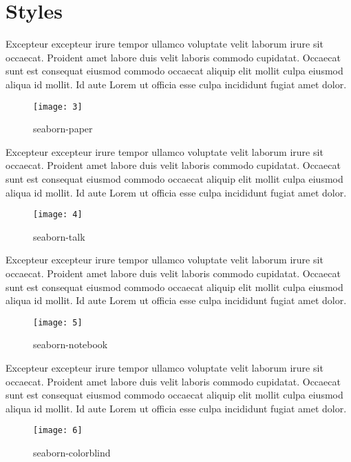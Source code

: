 \section{Styles}
\label{sec:styles}
Excepteur excepteur irure tempor ullamco voluptate velit laborum irure sit occaecat. Proident amet labore duis velit laboris commodo cupidatat. Occaecat sunt est consequat eiusmod commodo occaecat aliquip elit mollit culpa eiusmod aliqua id mollit. Id aute Lorem ut officia esse culpa incididunt fugiat amet dolor.

\begin{figure}[!h]
    \centering
    \texttt{[image: 3]}
    \caption{seaborn-paper}
    \label{fig:seaborn-paper}
\end{figure}

Excepteur excepteur irure tempor ullamco voluptate velit laborum irure sit occaecat. Proident amet labore duis velit laboris commodo cupidatat. Occaecat sunt est consequat eiusmod commodo occaecat aliquip elit mollit culpa eiusmod aliqua id mollit. Id aute Lorem ut officia esse culpa incididunt fugiat amet dolor.

\begin{figure}[!h]
    \centering
    \texttt{[image: 4]}
    \caption{seaborn-talk}
    \label{fig:seaborn-talk}
\end{figure}

Excepteur excepteur irure tempor ullamco voluptate velit laborum irure sit occaecat. Proident amet labore duis velit laboris commodo cupidatat. Occaecat sunt est consequat eiusmod commodo occaecat aliquip elit mollit culpa eiusmod aliqua id mollit. Id aute Lorem ut officia esse culpa incididunt fugiat amet dolor.

\begin{figure}[!h]
    \centering
    \texttt{[image: 5]}
    \caption{seaborn-notebook}
    \label{fig:seaborn-notebook}
\end{figure}

Excepteur excepteur irure tempor ullamco voluptate velit laborum irure sit occaecat. Proident amet labore duis velit laboris commodo cupidatat. Occaecat sunt est consequat eiusmod commodo occaecat aliquip elit mollit culpa eiusmod aliqua id mollit. Id aute Lorem ut officia esse culpa incididunt fugiat amet dolor.

\begin{figure}[!h]
    \centering
    \texttt{[image: 6]}
    \caption{seaborn-colorblind}
    \label{fig:seaborn-colorblind}
\end{figure}

